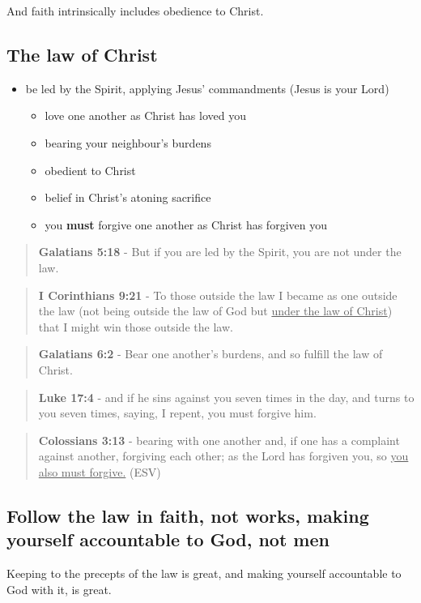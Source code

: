 \documentclass[11pt]{article}
\begin{document}
And faith intrinsically includes obedience to Christ.

\subsection{The law of Christ}
\label{sec:orgb483f40}
\begin{itemize}
\item be led by the Spirit, applying Jesus' commandments (Jesus is your Lord)
\begin{itemize}
\item love one another as Christ has loved you
\item bearing your neighbour's burdens
\item obedient to Christ
\item belief in Christ's atoning sacrifice
\item you \textbf{must} forgive one another as Christ has forgiven you
\end{itemize}
\end{itemize}

\begin{quote}
\textbf{Galatians 5:18} - But if you are led by the Spirit, you are not under the law.
\end{quote}

\begin{quote}
\textbf{I Corinthians 9:21} - To those outside the law I became as one outside the law (not being outside the law of God but \uline{under the law of Christ}) that I might win those outside the law.
\end{quote}

\begin{quote}
\textbf{Galatians 6:2} - Bear one another's burdens, and so fulfill the law of Christ.
\end{quote}

\begin{quote}
\textbf{Luke 17:4} - and if he sins against you seven times in the day, and turns to you seven times, saying, I repent, you must forgive him.
\end{quote}

\begin{quote}
\textbf{Colossians 3:13} - bearing with one another and, if one has a complaint against another, forgiving each other; as the Lord has forgiven you, so \uline{you also must forgive.} (ESV)
\end{quote}

\subsection{Follow the law in faith, not works, making yourself accountable to God, not men}
\label{sec:org54bba01}
Keeping to the precepts of the law is great, and making yourself accountable to God with it, is great.
\end{document}
